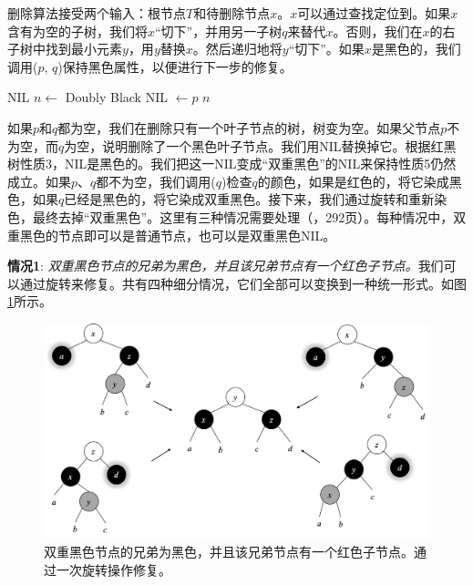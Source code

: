 \documentclass[b5paper]{ctexart}
\begin{document}
删除算法接受两个输入：根节点$T$和待删除节点$x$。$x$可以通过查找定位到。如果$x$含有为空的子树，我们将$x$“切下”，并用另一子树$q$来替代$x$。否则，我们在$x$的右子树中找到最小元素$y$，用$y$替换$x$。然后递归地将$y$“切下”。如果$x$是黑色的，我们调用($p$, $q$)保持黑色属性，以便进行下一步的修复。

\begin{algorithmic}[1]
    \State \Return NIL 
    \State $n \gets$ Doubly Black NIL
    \State {} $\gets p$
    \State \Return $n$
  \Else
    \State \Return {}
  \EndIf
\EndFunction
\end{algorithmic}

如果$p$和$q$都为空，我们在删除只有一个叶子节点的树，树变为空。如果父节点$p$不为空，而$q$为空，说明删除了一个黑色叶子节点。我们用NIL替换掉它。根据红黑树性质3，NIL是黑色的。我们把这一NIL变成“双重黑色”的NIL来保持性质5仍然成立。如果$p$、$q$都不为空，我们调用($q$)检查$q$的颜色，如果是红色的，将它染成黑色，如果$q$已经是黑色的，将它染成双重黑色。接下来，我们通过旋转和重新染色，最终去掉“双重黑色”。这里有三种情况需要处理（\cite{CLRS}，292页）。每种情况中，双重黑色的节点即可以是普通节点，也可以是双重黑色NIL。

\textbf{情况1}: {\em 双重黑色节点的兄弟为黑色，并且该兄弟节点有一个红色子节点。}我们可以通过旋转来修复。共有四种细分情况，它们全部可以变换到一种统一形式。如图\cref{fig:del-case1}所示。

\begin{figure}[htbp]
   \centering
   \includegraphics[scale=0.4]{../../../datastruct/tree/red-black-tree/img/del-case1}
   \caption{双重黑色节点的兄弟为黑色，并且该兄弟节点有一个红色子节点。通过一次旋转操作修复。}
   \label{fig:del-case1}
\end{figure}
\end{document}
